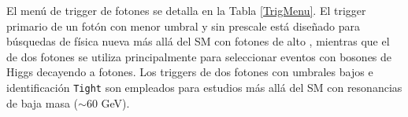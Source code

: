 El menú de trigger de fotones se detalla en la Tabla \ref{TrigMenu}. El trigger primario de un fotón con menor umbral y sin prescale  está diseñado para búsquedas de física nueva más allá del SM con fotones de alto \ET, mientras que el de dos fotones se utiliza principalmente para seleccionar eventos con bosones de Higgs decayendo a fotones. Los triggers de dos fotones con umbrales bajos e identificación \texttt{Tight} son empleados para estudios más allá del SM con resonancias de baja masa ($\sim60$ GeV).



\begin{table} 
\caption{Menú del trigger de fotones utilizados a lo largo de cada año durante el Run 2.}
	\centering
{}
	\label{TrigMenu}
\end{table}




